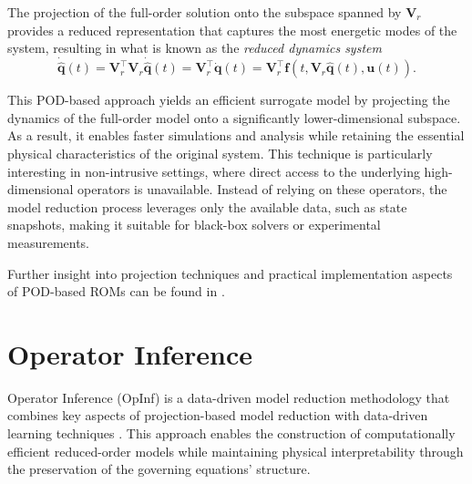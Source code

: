The projection of the full-order solution onto the subspace spanned by $\mathbf{V}_r$ provides a reduced representation that captures the most energetic modes of the system, resulting in what is known as the \textit{reduced dynamics system}\\
\begin{equation}
    \dot{\hat{\mathbf{q}}}(t) = \mathbf{V}_r^{\top}\mathbf{V}_r^{}\dot{\hat{\mathbf{q}}}(t) = \mathbf{V}_r^{\top}\dot{\mathbf{q}}(t)  = \mathbf{V}_r^{\top}\mathbf{f}(t, \mathbf{V}_r\hat{\mathbf{q}}(t), \mathbf{u}(t)).
    \label{eq:reduced_system}
\end{equation}

This POD-based approach yields an efficient surrogate model by projecting the dynamics of the full-order model onto a significantly lower-dimensional subspace. As a result, it enables faster simulations and analysis while retaining the essential physical characteristics of the original system. This technique is particularly interesting in non-intrusive settings, where direct access to the underlying high-dimensional operators is unavailable. Instead of relying on these operators, the model reduction process leverages only the available data, such as state snapshots, making it suitable for black-box solvers or experimental measurements.

Further insight into projection techniques and practical implementation aspects of POD-based ROMs can be found in \cite{opinf2025}.




\section{Operator Inference}
\label{sec:operator_inference}


Operator Inference (OpInf) is a data-driven model reduction methodology that combines key aspects of projection-based model reduction with data-driven learning techniques \cite{kramer2024learning,peherstorfer2016data}. This approach enables the construction of computationally efficient reduced-order models while maintaining physical interpretability through the preservation of the governing equations' structure.

